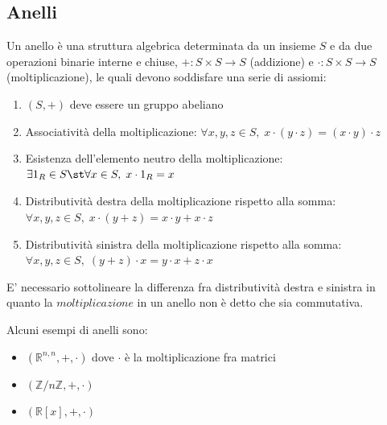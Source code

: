 \subsection{Anelli} \label{subsec:rings}
    Un anello è una struttura algebrica determinata da un insieme $S$ e da due operazioni binarie interne e chiuse, $+: S \times S \rightarrow S$ (addizione) e $\cdot : S \times S \rightarrow S$ (moltiplicazione), le quali devono soddisfare una serie di assiomi:
    \begin{enumerate}[label=(\arabic*)]
        \item $(S, +)$ deve essere un gruppo abeliano
        \item Associatività della moltiplicazione: $\forall x, y, z \in S, \; x \cdot (y \cdot z) = (x \cdot y) \cdot z$
        \item Esistenza dell'elemento neutro della moltiplicazione: $\exists 1_R \in S \st \forall x \in S, \; x \cdot 1_R = x$
        \item Distributività destra della moltiplicazione rispetto alla somma: $\forall x, y, z \in S, \; x \cdot (y + z) = x \cdot y + x \cdot z$
        \item Distributività sinistra della moltiplicazione rispetto alla somma: $\forall x, y, z \in S, \; (y + z) \cdot x = y \cdot x + z \cdot x$
    \end{enumerate}
    E' necessario sottolineare la differenza fra distributività destra e sinistra in quanto la $\textit{moltiplicazione}$ in un anello non è detto che sia commutativa.

    \vspace{10pt}
    Alcuni esempi di anelli sono:
    \begin{itemize}
        \item $(\mathbb{R}^{n, n}, +, \cdot)$ dove $\cdot$ è la moltiplicazione fra matrici
        \item $(\mathbb{Z}/n\mathbb{Z}, +, \cdot)$
        \item $(\mathbb{R}[x], +, \cdot)$
    \end{itemize}



